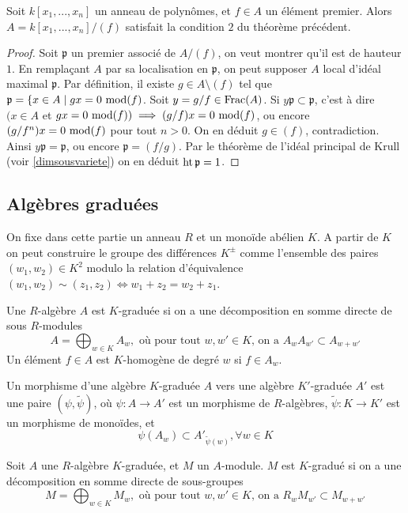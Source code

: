 \begin{prop}\label{SerreCritere2}
Soit $k[x_1,...,x_n]$ un anneau de polynômes, et $f\in A$ un élément premier. Alors $A=k[x_1,...,x_n]/(f)$ satisfait la condition $2$ du théorème précédent. 
\end{prop}
\begin{proof}
Soit $\mathfrak{p}$ un premier associé de $A/(f)$, on veut montrer qu'il est de hauteur $1$. En remplaçant $A$ par sa localisation en $\mathfrak{p}$, on peut supposer $A$ local d'idéal maximal $\mathfrak{p}$. Par définition, il existe $g\in A\setminus (f) $ tel que $\mathfrak{p}=\lbrace x\in A\mid gx=0 \,\operatorname{mod} (f)$. Soit $y=g/f\in \operatorname{Frac}(A)$. Si $y\mathfrak{p}\subset\mathfrak{p}$, c'est à dire $(x\in A$ et $gx=0 \,\operatorname{mod} (f))\implies (g/f)x=0\,\operatorname{mod} (f)$, ou encore $(g/f^n)x=0\,\operatorname{mod} (f)$ pour tout $n>0$. On en déduit $g\in (f)$, contradiction. Ainsi $y\mathfrak{p}=\mathfrak{p}$, ou encore $\mathfrak{p}=(f/g)$. Par le théorème de l'idéal principal de Krull (voir \ref{dimsousvariete}) on en déduit $\operatorname{ht} \mathfrak{p}=1$.
\end{proof}

\subsection{Algèbres graduées}

On fixe dans cette partie un anneau $R$ et un monoïde abélien $K$. A partir de $K$ on peut construire le groupe des différences $K^{\pm}$ comme l'ensemble des paires $(w_1,w_2)\in K^2$ modulo la relation d'équivalence $(w_1,w_2)\sim (z_1,z_2)\iff w_1+z_2=w_2+z_1$. 

\begin{defn}
Une $R$-algèbre $A$ est $K$-graduée si on a une décomposition en somme directe de sous $R$-modules 
$$A=\bigoplus_{w\in K}A_w,\text{ où pour tout } w,w'\in K\text{, on a }A_wA_{w'}\subset A_{w+w'}$$
Un élément $f\in A$ est $K$-homogène de degré $w$ si $f\in A_w$.

Un morphisme d'une algèbre $K$-graduée $A$ vers une algèbre $K'$-graduée $A'$ est une paire $(\psi,\widetilde{\psi})$, où $\psi:A\rightarrow A'$ est un morphisme de $R$-algèbres, $\widetilde{\psi}:K\rightarrow K'$ est un morphisme de monoïdes, et
$$\psi(A_w)\subset A'_{\widetilde{\psi}(w)}, \forall w\in K$$  
\end{defn}

\begin{defn}
Soit $A$ une $R$-algèbre $K$-graduée, et $M$ un $A$-module. $M$ est $K$-gradué si on a une décomposition en somme directe de sous-groupes
$$M=\bigoplus_{w\in K}M_w,\text{ où pour tout } w,w'\in K\text{, on a }R_wM_{w'}\subset M_{w+w'}$$
\end{defn}

